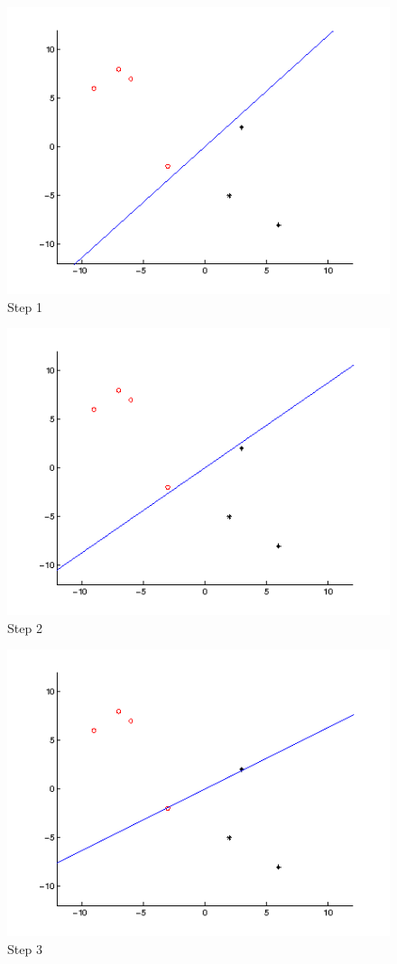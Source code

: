 \begin{figure}
\centering{}\includegraphics[width=1\textwidth]{plots/6_1}\caption{Step 1}
\end{figure}
\begin{figure}
\centering{}\includegraphics[width=1\textwidth]{plots/6_2}\caption{Step 2}
\end{figure}
\begin{figure}
\centering{}\includegraphics[width=1\textwidth]{plots/6_3}\caption{Step 3}
\end{figure}
